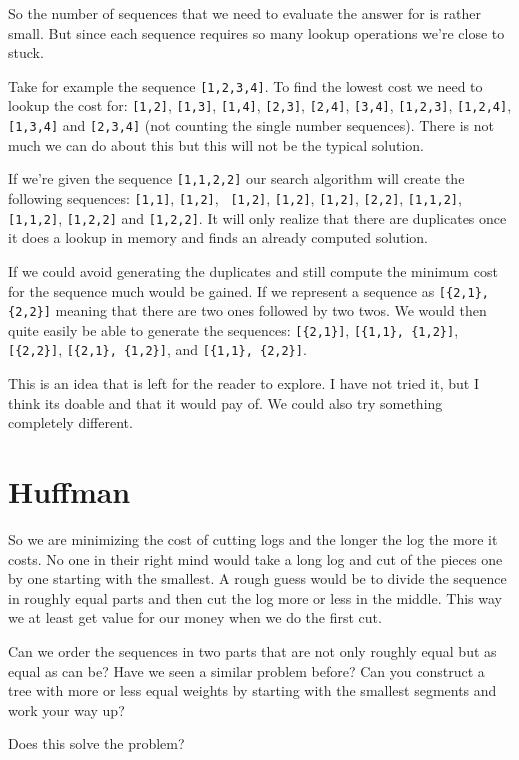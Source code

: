 \documentclass[a4paper,11pt]{article}
\begin{document}
So the number of sequences that we need to evaluate the answer for is
rather small. But since each sequence requires so many lookup
operations we're close to stuck.

Take for example the sequence {\tt [1,2,3,4]}. To find the lowest cost
we need to lookup the cost for: {\tt [1,2]}, {\tt [1,3]}, {\tt [1,4]},
{\tt [2,3]}, {\tt [2,4]}, {\tt [3,4]}, {\tt [1,2,3]}, {\tt [1,2,4]},
{\tt [1,3,4]} and {\tt [2,3,4]} (not counting the single number
sequences). There is not much we can do about this but this will not
be the typical solution.

If we're given the sequence {\tt [1,1,2,2]} our search algorithm will
create the following sequences: {\tt [1,1]}, {\tt [1,2]}, {\tt
  [1,2]}, {\tt [1,2]}, {\tt [1,2]}, {\tt [2,2]}, {\tt [1,1,2]}, {\tt
  [1,1,2]}, {\tt [1,2,2]} and {\tt [1,2,2]}. It will only realize that
there are duplicates once it does a lookup in memory and finds an
already computed solution.

If we could avoid generating the duplicates and still compute the
minimum cost for the sequence much would be gained. If we represent a
sequence as {\tt [\{2,1\}, \{2,2\}]} meaning that there are two ones
followed by two twos. We would then quite easily be able to generate
the sequences: {\tt [\{2,1\}]}, {\tt [\{1,1\}, \{1,2\}]}, {\tt [\{2,2\}]},
{\tt [\{2,1\}, \{1,2\}]}, and {\tt [\{1,1\}, \{2,2\}]}.

This is an idea that is left for the reader to explore. I have not
tried it, but I think its doable and that it would pay of. We could
also try something completely different.

\section*{Huffman}

So we are minimizing the cost of cutting logs and the longer the log
the more it costs. No one in their right mind would take a long log
and cut of the pieces one by one starting with the smallest. A rough
guess would be to divide the sequence in roughly equal parts and then
cut the log more or less in the middle. This way we at least get value
for our money when we do the first cut.

Can we order the sequences in two parts that are not only roughly equal
but as equal as can be? Have we seen a similar problem before? Can you
construct a tree with more or less equal weights by starting with the
smallest segments and work your way up?

Does this solve the problem?
\end{document}
